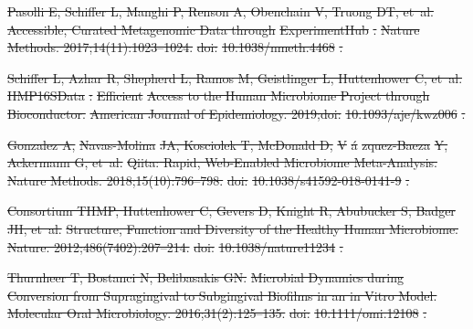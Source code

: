 \documentclass[10pt,letterpaper]{article}
\providecommand{\DIFdeltex}[1]{{\protect\color{red}\sout{#1}}}                      %
\providecommand{\DIFdel}[1]{\texorpdfstring{\DIFdeltex{#1}}{}} %
\begin{document}
\DIFdel{Pasolli E, Schiffer L, Manghi P, Renson A, Obenchain V, Truong DT, et~al.
}%
\DIFdel{Accessible, Curated Metagenomic Data through }%
\DIFdel{ExperimentHub}%
\DIFdel{.
}%
\DIFdel{Nature Methods. 2017;14(11):1023--1024.
}%
\DIFdel{doi:}%
\DIFdel{10.1038/nmeth.4468}%
\DIFdel{.
}%

\DIFdel{Schiffer L, Azhar R, Shepherd L, Ramos M, Geistlinger L, Huttenhower C, et~al.
}%
\DIFdel{HMP16SData}%
\DIFdel{: }%
\DIFdel{Efficient}%
\DIFdel{Access to the Human Microbiome Project
  through Bioconductor.
}%
\DIFdel{American Journal of Epidemiology. 2019;doi:}%
\DIFdel{10.1093/aje/kwz006}%
\DIFdel{.
}%

\DIFdel{Gonzalez A, }%
\DIFdel{Navas-Molina}%
\DIFdel{JA, Kosciolek T, McDonald D, }%
\DIFdel{V}%
\DIFdel{\'a}%
\DIFdel{zquez-Baeza}%
\DIFdel{Y,
  Ackermann G, et~al.
}%
\DIFdel{Qiita: Rapid, Web-Enabled Microbiome Meta-Analysis.
}%
\DIFdel{Nature Methods. 2018;15(10):796--798.
}%
\DIFdel{doi:}%
\DIFdel{10.1038/s41592-018-0141-9}%
\DIFdel{.
}%

\DIFdel{Consortium THMP, Huttenhower C, Gevers D, Knight R, Abubucker S, Badger JH,
  et~al.
}%
\DIFdel{Structure, Function and Diversity of the Healthy Human Microbiome.
}%
\DIFdel{Nature. 2012;486(7402):207--214.
}%
\DIFdel{doi:}%
\DIFdel{10.1038/nature11234}%
\DIFdel{.
}%

\DIFdel{Thurnheer T, Bostanci N, Belibasakis GN.
}%
\DIFdel{Microbial Dynamics during Conversion from Supragingival to
  Subgingival Biofilms in an in Vitro Model.
}%
\DIFdel{Molecular Oral Microbiology. 2016;31(2):125--135.
}%
\DIFdel{doi:}%
\DIFdel{10.1111/omi.12108}%
\DIFdel{.
}%
\end{document}
